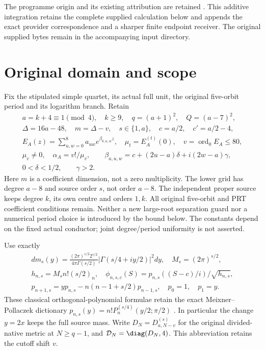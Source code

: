 \documentclass[11pt,a4paper]{article}
\begin{document}
The programme origin and its existing attribution are retained
\cite{peq:human:globalization2026,peq:human:splitzero2026}. This additive
integration retains the complete supplied calculation below and appends
the exact provider correspondence and a sharper finite endpoint receiver.
The original supplied bytes remain in the accompanying input directory.

\section{Original domain and scope}
Fix the stipulated simple quartet, its actual full unit, the original five-orbit period and its logarithm branch. Retain
\begin{equation}
\begin{gathered}
 a=k+4\equiv1\pmod4,\quad k\ge9,\quad q=(a+1)^2,\quad Q=(a-7)^2,\\
 \Delta=16a-48,\quad m=\Delta-v,\quad s\in\{1,a\},\quad
 c=a/2,\quad c'=a/2-4,\\
 E_A(z)=\sum_{u,w=0}^8a_{uw}e^{\beta_{8,u,w}z},\quad
 \mu_t=E_A^{(t)}(0),\quad v=\operatorname{ord}_0E_A\le80,\\
 \mu_v\ne0,\quad \alpha_A=v!/\mu_v,\qquad
 \beta_{a,u,w}=c+(2u-a)\delta+i(2w-a)\gamma,\\
 0<\delta<1/2,\qquad\gamma>2.
\end{gathered}\label{peq:peq:data}
\end{equation}
Here $m$ is a coefficient dimension, not a zero multiplicity. The lower grid has degree $a-8$ and source order $s$, not order $a-8$. The independent proper source keeps degree $k$, its own centre and orders $1,k$. All original five-orbit and PRT coefficient conditions remain. Neither a new large-root separation guard nor a numerical period choice is introduced by the bound below. The constants depend on the fixed actual conductor; joint degree/period uniformity is not asserted.

Use exactly
\begin{equation}
\begin{gathered}
 dm_s(y)=\frac{(2\pi)^{s/2}2^{s/2}}{4\pi\Gamma(s/2)}
 |\Gamma(s/4+iy/2)|^2dy,\quad M_s=(2\pi)^{s/2},\\
 h_{n,s}=M_sn!(s/2)_n,\quad
 \phi_{n,s,c}(S)=p_{n,s}((S-c)/i)/\sqrt{h_{n,s}},\\
 p_{n+1,s}=yp_{n,s}-n(n-1+s/2)p_{n-1,s},\quad p_0=1,\quad p_1=y.
\end{gathered}\label{peq:peq:gamma}
\end{equation}
These classical orthogonal-polynomial formulae retain the exact
Meixner--Pollaczek dictionary
$p_{n,s}(y)=n!P_n^{(s/4)}(y/2;\pi/2)$
\cite[eqs.~(18.19.8)--(18.19.9), (18.23.7)]{peq:human:dlmf18}.
In particular the change $y=2x$ keeps the full source mass.
Write $D_N=D_{a,N-v}^{(s)}$ for the original divided-native metric at $N\ge q-1$, and $\mathcal D_N=\diag(D_N,4)$. This abbreviation retains the cutoff shift $v$.
\end{document}

